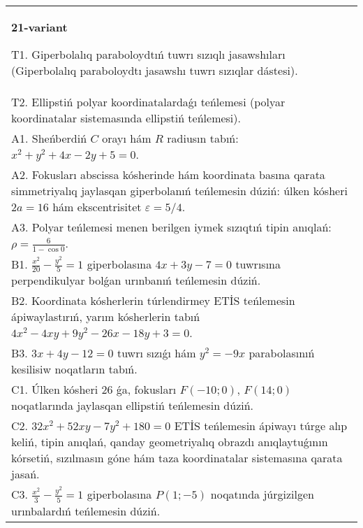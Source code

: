 \documentclass{article}
\begin{document}
\begin{tabular}{m{17cm}}
\textbf{21-variant}
\newline

T1. Giperbolalıq paraboloydtıń tuwrı sızıqlı jasawshıları (Giperbolalıq paraboloydtı jasawshı tuwrı sızıqlar dástesi).\\

T2. Ellipstiń polyar koordinatalardaǵı teńlemesi (polyar koordinatalar sistemasında ellipstiń teńlemesi).\\

A1. Sheńberdiń $C$ orayı hám $R$ radiusın tabıń: $x^2+y^2+4 x-2 y+5=0$.\\

A2. Fokusları abscissa kósherinde hám koordinata basına qarata simmetriyalıq jaylasqan giperbolanıń teńlemesin dúziń: úlken kósheri $2 a=16$ hám ekscentrisitet $\varepsilon=5/4$.\\

A3. Polyar teńlemesi menen berilgen iymek sızıqtıń tipin anıqlań: $\rho=\frac{6}{1-\cos 0}$.\\

B1. $\frac{x^{2}}{20} - \frac{y^{2}}{5} = 1$ giperbolasına $4x + 3y - 7 = 0$ tuwrısına perpendikulyar bolǵan urınbanıń teńlemesin dúziń.  \\

B2. Koordinata kósherlerin túrlendirmey ETİS teńlemesin ápiwaylastırıń, yarım kósherlerin tabıń $4x^{2} - 4xy + 9y^{2} - 26x - 18y + 3 = 0$.\\

B3. $3x + 4y - 12 = 0$ tuwrı sızıǵı hám $y^{2} = - 9x$ parabolasınıń kesilisiw noqatların tabıń.  \\

C1. Úlken kósheri 26 ǵa, fokusları $F( - 10;0)$, $F(14;0)$ noqatlarında jaylasqan ellipstiń teńlemesin dúziń.  \\

C2. $32x^{2} + 52xy - 7y^{2} + 180 = 0$ ETİS teńlemesin ápiwayı túrge alıp keliń, tipin anıqlań, qanday geometriyalıq obrazdı anıqlaytuǵının kórsetiń, sızılmasın góne hám taza koordinatalar sistemasına qarata jasań.  \\

C3. $\frac{x^{2}}{3} - \frac{y^{2}}{5} = 1$ giperbolasına $P(1; - 5)$ noqatında júrgizilgen urınbalardıń teńlemesin dúziń.\\

\end{tabular}
\vspace{1cm}
\end{document}
